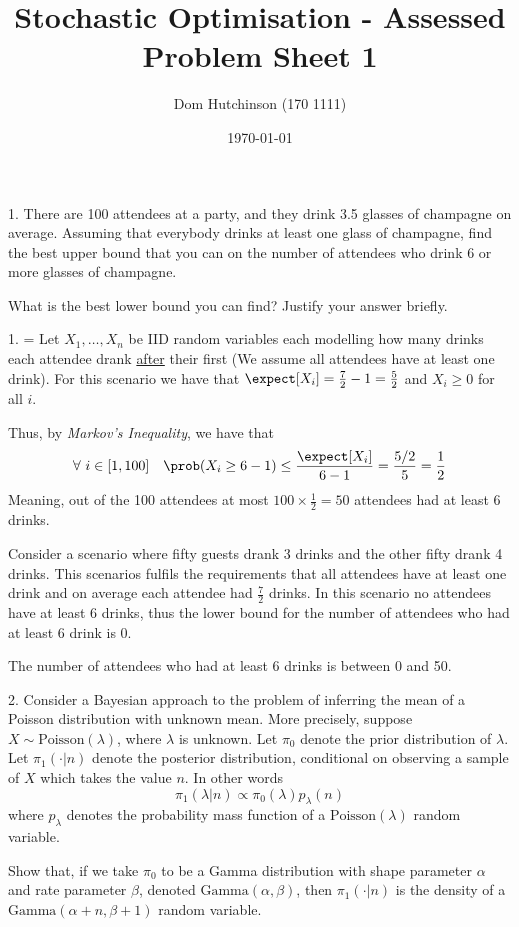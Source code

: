\documentclass[11pt,a4paper]{article}
\begin{document}

\title{Stochastic Optimisation - Assessed Problem Sheet 1}
\author{Dom Hutchinson (170 1111)}
\date{\today}
\maketitle


\begin{question}{1.}
  There are 100 attendees at a party, and they drink 3.5 glasses of champagne on average. Assuming that everybody drinks at least one glass of champagne, find the best upper bound that you can on the number of attendees who drink 6 or more glasses of champagne.
  \par What is the best lower bound you can find? Justify your answer briefly.
\end{question}

\begin{answer}{1.}
  \everymath={}
  Let $X_1,\dots,X_n$ be IID random variables each modelling how many drinks each attendee drank \underline{after} their first (We assume all attendees have at least one drink). For this scenario we have that $\expect[X_i]=\frac72-1=\frac52$ and $X_i\geq0$ for all $i$.
  \par Thus, by \textit{Markov's Inequality}, we have that
  \[ \forall\ i\in[1,100]\quad\prob(X_i\geq6-1)\leq\frac{\expect[X_i]}{6-1}=\frac{5/2}5=\frac12 \]
  Meaning, out of the 100 attendees at most $100\times\frac12=50$ attendees had at least 6 drinks.

  \par Consider a scenario where fifty guests drank 3 drinks and the other fifty drank 4 drinks. This scenarios fulfils the requirements that all attendees have at least one drink and on average each attendee had $\frac72$ drinks. In this scenario no attendees have at least 6 drinks, thus the lower bound for the number of attendees who had at least 6 drink is 0.
  \par The number of attendees who had at least 6 drinks is between 0 and 50.
\end{answer}

\begin{question}{2.}
  Consider a Bayesian approach to the problem of inferring the mean of a Poisson distribution with unknown mean. More precisely, suppose $X\sim\text{Poisson}(\lambda)$, where $\lambda$ is unknown. Let $\pi_0$ denote the prior distribution of $\lambda$. Let $\pi_1(\cdot|n)$ denote the posterior distribution, conditional on observing a sample of $X$ which takes the value $n$. In other words
  \[ \pi_1(\lambda|n)\propto \pi_0(\lambda)p_\lambda(n) \]
  where $p_\lambda$ denotes the probability mass function of a $\text{Poisson}(\lambda)$ random variable.
  \par Show that, if we take $\pi_0$ to be a Gamma distribution with shape parameter $\alpha$ and rate parameter $\beta$, denoted $\text{Gamma}(\alpha,\beta)$, then $\pi_1(\cdot|n)$ is the density of a $\text{Gamma}(\alpha+n,\beta+1)$ random variable.
\end{question}
\end{document}
